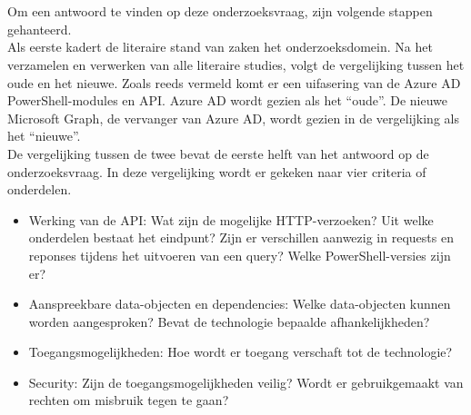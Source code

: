 
\chapter{}%
\label{ch:methodologie}


Om een antwoord te vinden op deze onderzoeksvraag, zijn volgende stappen gehanteerd. \\

Als eerste kadert de literaire stand van zaken het onderzoeksdomein. Na het verzamelen en verwerken van alle literaire studies, volgt de vergelijking tussen het oude en het nieuwe. Zoals reeds vermeld komt er een uifasering van de Azure \ac{AD} PowerShell-modules en \ac{API}. Azure \ac{AD} wordt gezien als het “oude”. De nieuwe Microsoft Graph, de vervanger van Azure \ac{AD}, wordt gezien in de vergelijking als het “nieuwe”. \\

De vergelijking tussen de twee bevat de eerste helft van het antwoord op de onderzoeksvraag. In deze vergelijking wordt er gekeken naar vier criteria of onderdelen. 

\begin{itemize}
    \item Werking van de \ac{API}: Wat zijn de mogelijke \Ac{HTTP}-verzoeken? Uit welke onderdelen bestaat het eindpunt? Zijn er verschillen aanwezig in requests en reponses tijdens het uitvoeren van een query? Welke PowerShell-versies zijn er?
    \item Aanspreekbare data-objecten en dependencies: Welke data-objecten kunnen worden aangesproken? Bevat de technologie bepaalde afhankelijkheden?
    \item Toegangsmogelijkheden: Hoe wordt er toegang verschaft tot de technologie? 
    \item Security: Zijn de toegangsmogelijkheden veilig? Wordt er gebruikgemaakt van rechten om misbruik tegen te gaan?
\end{itemize}

